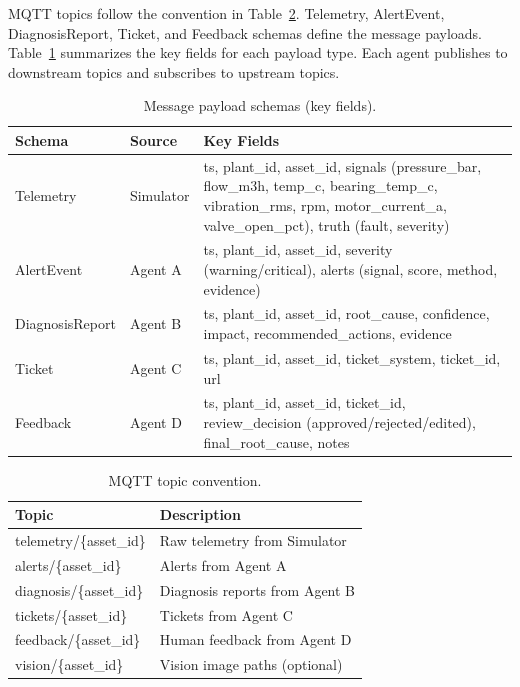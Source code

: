 \documentclass[12pt,letterpaper]{report}
\begin{document}
MQTT topics follow the convention in Table~\ref{tab:mqtt}. Telemetry, AlertEvent, DiagnosisReport, Ticket, and Feedback schemas define the message payloads. Table~\ref{tab:schemas} summarizes the key fields for each payload type. Each agent publishes to downstream topics and subscribes to upstream topics.

\begin{table}[htbp]
\centering
\caption{Message payload schemas (key fields).}
\label{tab:schemas}
\small
\begin{tabular}{llp{6.5cm}}
\toprule
\textbf{Schema} & \textbf{Source} & \textbf{Key Fields} \\
\midrule
Telemetry & Simulator & ts, plant\_id, asset\_id, signals (pressure\_bar, flow\_m3h, temp\_c, bearing\_temp\_c, vibration\_rms, rpm, motor\_current\_a, valve\_open\_pct), truth (fault, severity) \\
\addlinespace
AlertEvent & Agent A & ts, plant\_id, asset\_id, severity (warning/critical), alerts (signal, score, method, evidence) \\
\addlinespace
DiagnosisReport & Agent B & ts, plant\_id, asset\_id, root\_cause, confidence, impact, recommended\_actions, evidence \\
\addlinespace
Ticket & Agent C & ts, plant\_id, asset\_id, ticket\_system, ticket\_id, url \\
\addlinespace
Feedback & Agent D & ts, plant\_id, asset\_id, ticket\_id, review\_decision (approved/rejected/edited), final\_root\_cause, notes \\
\bottomrule
\end{tabular}
\end{table}

\begin{table}[htbp]
\centering
\caption{MQTT topic convention.}
\label{tab:mqtt}
\begin{tabular}{ll}
\toprule
\textbf{Topic} & \textbf{Description} \\
\midrule
telemetry/\{asset\_id\} & Raw telemetry from Simulator \\
alerts/\{asset\_id\} & Alerts from Agent A \\
diagnosis/\{asset\_id\} & Diagnosis reports from Agent B \\
tickets/\{asset\_id\} & Tickets from Agent C \\
feedback/\{asset\_id\} & Human feedback from Agent D \\
vision/\{asset\_id\} & Vision image paths (optional) \\
\bottomrule
\end{tabular}
\end{table}
\end{document}
